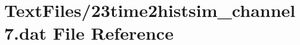 \hypertarget{23time2histsim__channel7_8dat}{}\section{Text\+Files/23time2histsim\+\_\+channel7.dat File Reference}
\label{23time2histsim__channel7_8dat}
